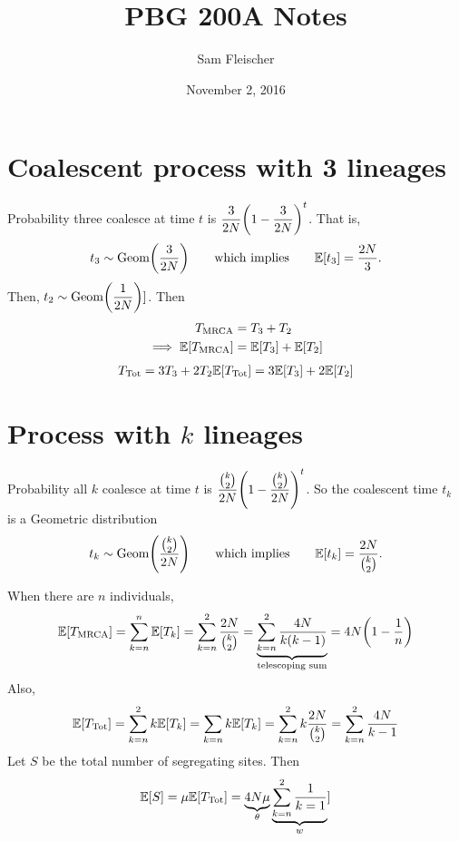 \documentclass{article}
\title{PBG 200A Notes}
\author{Sam Fleischer}
\date{November 2, 2016}
\newcommand{\expec}[1]{\mathbb{E}\qty[#1]}
\begin{document}
    \maketitle

    \section{Coalescent process with 3 lineages}
        Probability three coalesce at time $t$ is $\displaystyle\frac{3}{2N}\qty(1 - \frac{3}{2N})^t$.  That is,
        \begin{align}
            t_3 \sim \text{Geom}\qty(\frac{3}{2N}) \qquad \text{which implies} \qquad \expec{t_3} = \frac{2N}{3}.
        \end{align}
        Then, $t_2 \sim \text{Geom}\qty(\dfrac{1}{2N})]$.  Then
        \begin{align}
            T_\text{MRCA} &= T_3 + T_2 \\
            \implies \expec{T_\text{MRCA}} &= \expec{T_3} + \expec{T_2}
        \end{align}
        \begin{align}
            T_\text{Tot} = 3T_3 + 2T_2
            \expec{T_\text{Tot}} = 3\expec{T_3} + 2\expec{T_2}
        \end{align}

    \section{Process with $k$ lineages}
        Probability all $k$ coalesce at time $t$ is $\displaystyle\frac{{\binom{k}{2}}}{2N}\qty(1 - \frac{\binom{k}{2}}{2N})^t$.  So the coalescent time $t_k$ is a Geometric distribution
        \begin{align}
            t_k \sim \text{Geom}\qty(\frac{\binom{k}{2}}{2N}) \qquad \text{which implies} \qquad \expec{t_k} = \frac{2N}{\binom{k}{2}}.
        \end{align}

        When there are $n$ individuals,
        \begin{align}
            \expec{T_{\text{MRCA}}} = \sum_{k=n}^n\expec{T_k} = \sum_{k=n}^2 \frac{2N}{\binom{k}{2}} = \underbrace{\sum_{k=n}^2\frac{4N}{k(k-1)}}_\text{telescoping sum} = 4N\qty(1 - \frac{1}{n})
        \end{align}
        Also,
        \begin{align}
            \expec{T_\text{Tot}} = \sum_{k=n}^2 k\expec{T_k} = \sum_{k=n}k\expec{T_k} = \sum_{k=n}^2 k \frac{2N}{\binom{k}{2}} = \sum_{k=n}^2 \frac{4N}{k-1}
        \end{align}
        Let $S$ be the total number of segregating sites.  Then
        \begin{align}
            \expec{S} = \mu\expec{T_\text{Tot}} = \underbrace{4N\mu}_\theta\underbrace{\sum_{k=n}^2\frac{1}{k=1}}_w]
        \end{align}
\end{document}
